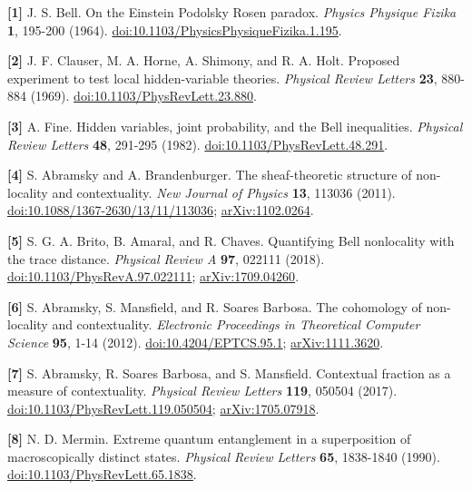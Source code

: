 \documentclass[
]{article}
\begin{document}
\textbf{{[}1{]}} J. S. Bell. On the Einstein Podolsky Rosen paradox. \emph{Physics Physique Fizika} \textbf{1}, 195-200 (1964). \href{https://doi.org/10.1103/PhysicsPhysiqueFizika.1.195}{doi:10.1103/PhysicsPhysiqueFizika.1.195}.

\textbf{{[}2{]}} J. F. Clauser, M. A. Horne, A. Shimony, and R. A. Holt. Proposed experiment to test local hidden-variable theories. \emph{Physical Review Letters} \textbf{23}, 880-884 (1969). \href{https://doi.org/10.1103/PhysRevLett.23.880}{doi:10.1103/PhysRevLett.23.880}.

\textbf{{[}3{]}} A. Fine. Hidden variables, joint probability, and the Bell inequalities. \emph{Physical Review Letters} \textbf{48}, 291-295 (1982). \href{https://doi.org/10.1103/PhysRevLett.48.291}{doi:10.1103/PhysRevLett.48.291}.

\textbf{{[}4{]}} S. Abramsky and A. Brandenburger. The sheaf-theoretic structure of non-locality and contextuality. \emph{New Journal of Physics} \textbf{13}, 113036 (2011). \href{https://doi.org/10.1088/1367-2630/13/11/113036}{doi:10.1088/1367-2630/13/11/113036}; \href{https://arxiv.org/abs/1102.0264}{arXiv:1102.0264}.

\textbf{{[}5{]}} S. G. A. Brito, B. Amaral, and R. Chaves. Quantifying Bell nonlocality with the trace distance. \emph{Physical Review A} \textbf{97}, 022111 (2018). \href{https://doi.org/10.1103/PhysRevA.97.022111}{doi:10.1103/PhysRevA.97.022111}; \href{https://arxiv.org/abs/1709.04260}{arXiv:1709.04260}.

\textbf{{[}6{]}} S. Abramsky, S. Mansfield, and R. Soares Barbosa. The cohomology of non-locality and contextuality. \emph{Electronic Proceedings in Theoretical Computer Science} \textbf{95}, 1-14 (2012). \href{https://doi.org/10.4204/EPTCS.95.1}{doi:10.4204/EPTCS.95.1}; \href{https://arxiv.org/abs/1111.3620}{arXiv:1111.3620}.

\textbf{{[}7{]}} S. Abramsky, R. Soares Barbosa, and S. Mansfield. Contextual fraction as a measure of contextuality. \emph{Physical Review Letters} \textbf{119}, 050504 (2017). \href{https://doi.org/10.1103/PhysRevLett.119.050504}{doi:10.1103/PhysRevLett.119.050504}; \href{https://arxiv.org/abs/1705.07918}{arXiv:1705.07918}.

\textbf{{[}8{]}} N. D. Mermin. Extreme quantum entanglement in a superposition of macroscopically distinct states. \emph{Physical Review Letters} \textbf{65}, 1838-1840 (1990). \href{https://doi.org/10.1103/PhysRevLett.65.1838}{doi:10.1103/PhysRevLett.65.1838}.
\end{document}
